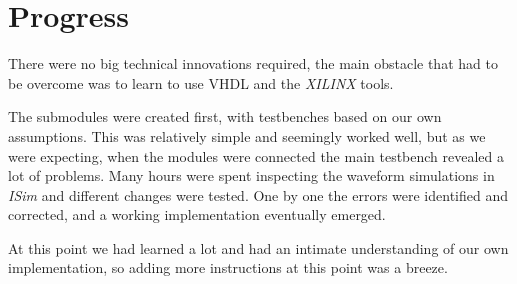 \section{Progress}
There were no big technical innovations required,
the main obstacle that had to be overcome was to learn to use VHDL and the \textit{XILINX} tools.

The submodules were created first,
with testbenches based on our own assumptions.
This was relatively simple and seemingly worked well,
but as we were expecting,
when the modules were connected the main testbench revealed a lot of problems.
Many hours were spent inspecting the waveform simulations in \textit{ISim} and different changes were tested.
One by one the errors were identified and corrected,
and a working implementation eventually emerged.

At this point we had learned a lot and had an intimate understanding of our own implementation,
so adding more instructions at this point was a breeze.
